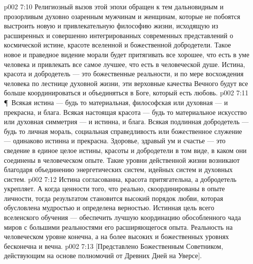 \vs p002 7:10 Религиозный вызов этой эпохи обращен к тем дальновидным и прозорливым духовно озаренным мужчинам и женщинам, которые не побоятся выстроить новую и привлекательную философию жизни, исходящую из расширенных и совершенно интегрированных современных представлений о космической истине, красоте вселенной и божественной добродетели. Такое новое и праведное видение морали будет притягивать все хорошее, что есть в уме человека и привлекать все самое лучшее, что есть в человеческой душе. Истина, красота и добродетель --- это божественные реальности, и по мере восхождения человека по лестнице духовной жизни, эти верховные качества Вечного будут все больше координироваться и объединяться в Боге, который есть любовь.
\vs p002 7:11 \P\ Всякая истина --- будь то материальная, философская или духовная --- и прекрасна, и блага. Всякая настоящая красота --- будь то материальное искусство или духовная симметрия --- и истинна, и блага. Всякая подлинная добродетель --- будь то личная мораль, социальная справедливость или божественное служение --- одинаково истинна и прекрасна. Здоровье, здравый ум и счастье --- это сведение в единое целое истины, красоты и добродетели в том виде, в каком они соединены в человеческом опыте. Такие уровни действенной жизни возникают благодаря объединению энергетических систем, идейных систем и духовных систем.
\vs p002 7:12 Истина согласованна, красота притягательна, а добродетель укрепляет. А когда ценности того, что реально, скоординированы в опыте личности, тогда результатом становится высокий порядок любви, которая обусловлена мудростью и определена верностью. Истинная цель всего вселенского обучения --- обеспечить лучшую координацию обособленного чада миров с большими реальностями его расширяющегося опыта. Реальность на человеческом уровне конечна, а на более высоких и божественных уровнях бесконечна и вечна.
\vs p002 7:13 [Представлено Божественным Советником, действующим на основе полномочий от Древних Дней на Уверсе].
